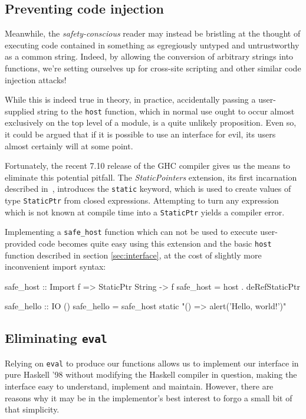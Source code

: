 \documentclass[preprint]{sigplanconf}
\begin{document}
\subsection{Preventing code injection}
\label{sec:safe_host}
Meanwhile, the \emph{safety-conscious} reader may instead be bristling at the
thought of executing code contained in something as egregiously untyped and
untrustworthy as a common string.
Indeed, by allowing the conversion of arbitrary strings
into functions, we're setting ourselves up for cross-site scripting and other
similar code injection attacks!

While this is indeed true in theory, in practice, accidentally passing a
user-supplied string to the \lstinline!host! function, which in normal use
ought to occur almost exclusively on the top level of a module, is a quite
unlikely proposition. Even so, it could be argued that if it is possible to use
an interface for evil, its users almost certainly will at some point.

Fortunately, the recent 7.10 release of the GHC compiler gives us the means to
eliminate this potential pitfall. The \emph{StaticPointers} extension, its
first incarnation described in\ \cite{cloudhaskell}, introduces the
\lstinline!static! keyword, which is used to create values of type
\lstinline!StaticPtr! from closed expressions. Attempting to turn any
expression which is not known at compile time into a \lstinline!StaticPtr!
yields a compiler error.

Implementing a \lstinline!safe_host! function which can not be used
to execute user-provided code becomes quite easy using
this extension and the basic \lstinline!host! function described in section
\ref{sec:interface}, at the cost of slightly more inconvenient import syntax:

\begin{code}
  safe_host :: Import f => StaticPtr String -> f
  safe_host = host . deRefStaticPtr

  safe_hello :: IO ()
  safe_hello = safe_host
    static "() => alert('Hello, world!')"
\end{code}

\subsection{Eliminating \lstinline!eval!}
\label{sec:inline-eval}
Relying on \lstinline!eval! to produce our functions allows us to
implement our interface in pure Haskell '98 without modifying the Haskell
compiler in question, making the interface easy to understand, implement and
maintain. However, there are reasons why it may be in the implementor's best
interest to forgo a small bit of that simplicity.
\end{document}
